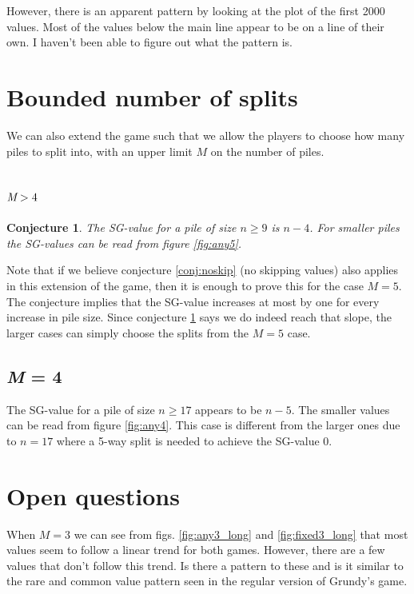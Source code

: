 \documentclass[english,a4paper,twoside]{amsart}
\theoremstyle{lemma}
\newtheorem{conj}{Conjecture}
\begin{document}
However, there is an apparent pattern by looking at the plot of the first
2000 values. Most of the values below the main line appear to be on a line of their own. I haven't
been able to figure out what the pattern is.

\section{Bounded number of splits}
We can also extend the game such that we allow the players to choose how many piles to split into,
with an upper limit $M$ on the number of piles.

\subsection{$\emph{M} > 4$}
\begin{conj}
\label{conj:any4plus}
The SG-value for a pile of size $n \geq 9$ is $n-4$.
For smaller piles the SG-values can be read from figure \ref{fig:any5}.
\end{conj}

Note that if we believe conjecture \ref{conj:noskip} (no skipping values) also applies in this
extension of the game, then it is enough to prove this for the case $M = 5$. The conjecture implies
that the SG-value increases at most by one for every increase in pile size. Since conjecture
\ref{conj:any4plus} says we do indeed reach that slope, the larger cases can simply choose the
splits from the $M=5$ case.

\subsection{\emph{M} = 4}
The SG-value for a pile of size $n\geq 17$ appears to be $n-5$.
The smaller values can be read from figure \ref{fig:any4}.
This case is different from the larger ones due to $n=17$ where a 5-way split is needed to achieve
the SG-value 0.


\section{Open questions}

When $M=3$ we can see from figs. \ref{fig:any3_long} and \ref{fig:fixed3_long} that most values
seem to follow a linear trend for both games. However, there
are a few values that don't follow this trend. Is there a pattern to these and is it similar to
the rare and common value pattern seen in the regular version of Grundy's game.
\end{document}
